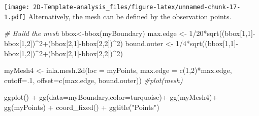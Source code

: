 \documentclass[
]{article}
\newenvironment{Shaded}{\begin{snugshade}}{\end{snugshade}}
\newcommand{\AttributeTok}[1]{\textcolor[rgb]{0.77,0.63,0.00}{#1}}
\newcommand{\CommentTok}[1]{\textcolor[rgb]{0.56,0.35,0.01}{\textit{#1}}}
\newcommand{\DecValTok}[1]{\textcolor[rgb]{0.00,0.00,0.81}{#1}}
\newcommand{\FunctionTok}[1]{\textcolor[rgb]{0.00,0.00,0.00}{#1}}
\newcommand{\NormalTok}[1]{#1}
\newcommand{\OtherTok}[1]{\textcolor[rgb]{0.56,0.35,0.01}{#1}}
\newcommand{\SpecialCharTok}[1]{\textcolor[rgb]{0.00,0.00,0.00}{#1}}
\newcommand{\StringTok}[1]{\textcolor[rgb]{0.31,0.60,0.02}{#1}}
\begin{document}
\texttt{[image: 2D-Template-analysis\_files/figure-latex/unnamed-chunk-17-1.pdf]}
Alternatively, the mesh can be defined by the observation points.

\begin{Shaded}
\begin{Highlighting}[]
\CommentTok{\# Build the mesh}
\NormalTok{bbox}\OtherTok{\textless{}{-}}\FunctionTok{bbox}\NormalTok{(myBoundary)}
\NormalTok{max.edge }\OtherTok{\textless{}{-}} \DecValTok{1}\SpecialCharTok{/}\DecValTok{20}\SpecialCharTok{*}\FunctionTok{sqrt}\NormalTok{((bbox[}\DecValTok{1}\NormalTok{,}\DecValTok{1}\NormalTok{]}\SpecialCharTok{{-}}\NormalTok{bbox[}\DecValTok{1}\NormalTok{,}\DecValTok{2}\NormalTok{])}\SpecialCharTok{\^{}}\DecValTok{2}\SpecialCharTok{+}\NormalTok{(bbox[}\DecValTok{2}\NormalTok{,}\DecValTok{1}\NormalTok{]}\SpecialCharTok{{-}}\NormalTok{bbox[}\DecValTok{2}\NormalTok{,}\DecValTok{2}\NormalTok{])}\SpecialCharTok{\^{}}\DecValTok{2}\NormalTok{)}
\NormalTok{bound.outer }\OtherTok{\textless{}{-}} \DecValTok{1}\SpecialCharTok{/}\DecValTok{4}\SpecialCharTok{*}\FunctionTok{sqrt}\NormalTok{((bbox[}\DecValTok{1}\NormalTok{,}\DecValTok{1}\NormalTok{]}\SpecialCharTok{{-}}\NormalTok{bbox[}\DecValTok{1}\NormalTok{,}\DecValTok{2}\NormalTok{])}\SpecialCharTok{\^{}}\DecValTok{2}\SpecialCharTok{+}\NormalTok{(bbox[}\DecValTok{2}\NormalTok{,}\DecValTok{1}\NormalTok{]}\SpecialCharTok{{-}}\NormalTok{bbox[}\DecValTok{2}\NormalTok{,}\DecValTok{2}\NormalTok{])}\SpecialCharTok{\^{}}\DecValTok{2}\NormalTok{)}

\NormalTok{myMesh4 }\OtherTok{\textless{}{-}} \FunctionTok{inla.mesh.2d}\NormalTok{(}\AttributeTok{loc =}\NormalTok{ myPoints,}
                    \AttributeTok{max.edge =} \FunctionTok{c}\NormalTok{(}\DecValTok{1}\NormalTok{,}\DecValTok{2}\NormalTok{)}\SpecialCharTok{*}\NormalTok{max.edge,}
                    \AttributeTok{cutoff=}\NormalTok{.}\DecValTok{1}\NormalTok{,}
                    \AttributeTok{offset=}\FunctionTok{c}\NormalTok{(max.edge, bound.outer))}
\CommentTok{\#plot(mesh)}

\FunctionTok{ggplot}\NormalTok{() }\SpecialCharTok{+}
     \FunctionTok{gg}\NormalTok{(}\AttributeTok{data=}\NormalTok{myBoundary,}\AttributeTok{color=}\StringTok{\textquotesingle{}turquoise\textquotesingle{}}\NormalTok{)}\SpecialCharTok{+}  
  \FunctionTok{gg}\NormalTok{(myMesh4)}\SpecialCharTok{+}
  \FunctionTok{gg}\NormalTok{(myPoints) }\SpecialCharTok{+}
  \FunctionTok{coord\_fixed}\NormalTok{() }\SpecialCharTok{+}
  \FunctionTok{ggtitle}\NormalTok{(}\StringTok{"Points"}\NormalTok{)}
\end{Highlighting}
\end{Shaded}
\end{document}
